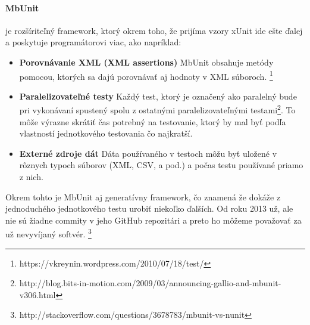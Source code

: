 \documentclass[11pt,twoside,slovak,a4paper]{article}
\begin{document}
			\paragraph{MbUnit} je rozšíriteľný framework, ktorý okrem toho, že prijíma vzory xUnit ide ešte ďalej a poskytuje programátorovi viac, ako napríklad:
			\begin{itemize}
				\item \textbf{Porovnávanie XML (XML assertions)} MbUnit obsahuje metódy pomocou, ktorých sa dajú porovnávať aj hodnoty v XML súboroch. \footnote{https://vkreynin.wordpress.com/2010/07/18/test/}
				\item \textbf{Paralelizovateľné testy} Každý test, ktorý je označený ako paralelný bude pri vykonávaní spustený spolu z ostatnými paralelizovateľnými testami\footnote{http://blog.bits-in-motion.com/2009/03/announcing-gallio-and-mbunit-v306.html}. To môže výrazne skrátiť čas potrebný na testovanie, ktorý by mal byť podľa vlastností jednotkového testovania čo najkratší. 
				\item \textbf{Externé zdroje dát} Dáta používaného v testoch môžu byť uložené v rôznych typoch súborov (XML, CSV, a pod.) a počas testu používané priamo z nich.
			\end{itemize}
			Okrem tohto je MbUnit aj generatívny framework, čo znamená že dokáže z jednoduchého jednotkového testu urobiť niekoľko ďalších. Od roku 2013 už, ale nie sú žiadne commity v jeho GitHub repozitári a preto ho môžeme považovať za už nevyvíjaný softvér. \footnote{http://stackoverflow.com/questions/3678783/mbunit-vs-nunit}
			
\end{document}
